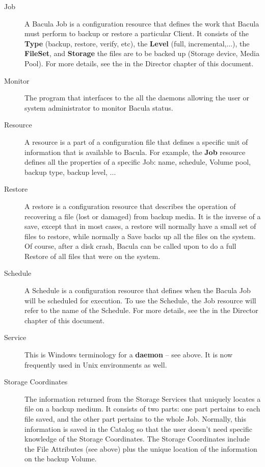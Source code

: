\begin{description}
\item [
   \label{JobDef}
   Job]
A Bacula Job is a configuration resource that defines  the work that Bacula
must perform to backup or restore a particular  Client. It consists of the
{\bf Type} (backup, restore, verify,  etc), the {\bf Level} (full,
incremental,...), the {\bf FileSet},  and {\bf Storage} the files are to be
backed up (Storage device,  Media Pool). For more details, see the 
 in the  Director
chapter of this document. 

\item [Monitor]
   The program that interfaces to the all the daemons  allowing the user or
system administrator to monitor Bacula status. 

\item [Resource]
   A resource is a part of a configuration file that  defines a specific unit of
information that is available to Bacula.  For example, the {\bf Job} resource
defines all the properties of  a specific Job: name, schedule, Volume pool,
backup type, backup  level, ... 

\item [Restore]
   A restore is a configuration resource that  describes the operation of
recovering a file (lost or damaged) from  backup media. It is the inverse of a
save, except that in most  cases, a restore will normally have a small set of
files to restore,  while normally a Save backs up all the files on the system.
Of  course, after a disk crash, Bacula can be called upon to do  a full
Restore of all files that were on the system. 

\item [Schedule]
   A Schedule is a configuration resource that  defines when the Bacula Job will
be scheduled for  execution. To use the Schedule, the Job resource will refer
to  the name of the Schedule. For more details, see the 
 in the
Director chapter of this document. 

\item [Service]
   This is Windows terminology for a {\bf daemon} -- see  above. It is now
frequently used in Unix environments as well. 

\item [Storage Coordinates]
   The information returned from the  Storage Services that uniquely locates a
file on a backup medium. It  consists of two parts: one part pertains to each
file saved, and the  other part pertains to the whole Job. Normally, this
information is  saved in the Catalog so that the user doesn't need specific
knowledge  of the Storage Coordinates. The Storage Coordinates include the 
File Attributes (see above) plus the unique location of the information on 
the backup Volume. 


\end{description}
